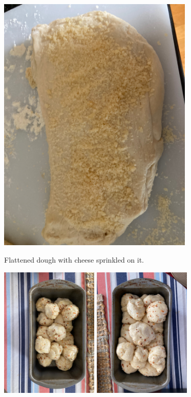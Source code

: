\documentclass[
]{book}
\begin{document}
\includegraphics[width=0.7\textwidth,height=\textheight]{images/drolls4.jpeg}

Flattened dough with cheese sprinkled on it.

\includegraphics[width=0.35\textwidth,height=\textheight]{images/drolls5.jpeg} \includegraphics[width=0.35\textwidth,height=\textheight]{images/drolls6.jpeg}
\end{document}
